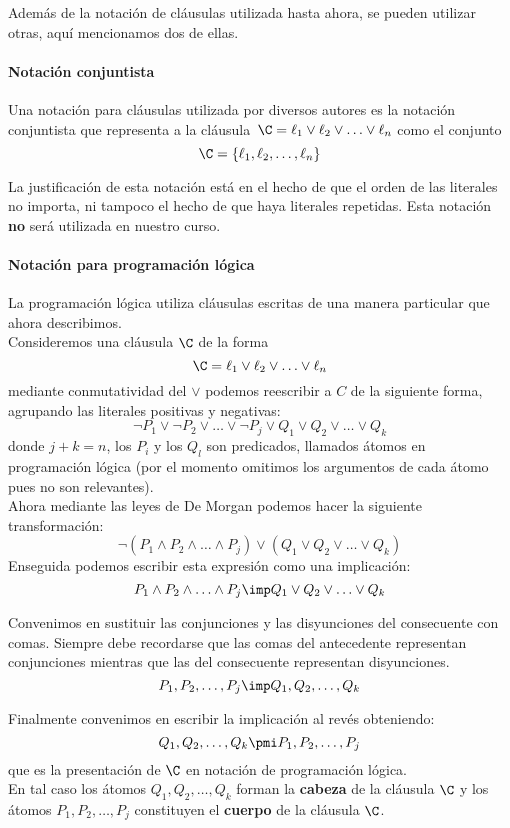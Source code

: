 \documentclass[11pt,letterpaper]{article}
\begin{document}
Además de la notación de cláusulas utilizada hasta ahora, se pueden
utilizar otras, aquí mencionamos dos de ellas.

\paragraph{Notación conjuntista}
Una notaci\'on para cláusulas utilizada por diversos autores es la notaci\'on 
conjuntista que representa a la 
cl\'ausula~$\C= \ell_1\lor \ell_2\lor\ldots\lor \ell_n$
como el conjunto
$$
\C=\{\ell_1,\ell_2,\ldots,\ell_n\}
$$

La justificación de esta notaci\'on est\'a en el hecho de que el orden de
las literales no importa, ni tampoco el hecho de que haya literales
repetidas. Esta notaci\'on \textbf{no} ser\'a utilizada en nuestro curso.

\paragraph{Notaci\'on para programaci\'on l\'ogica}
La programaci\'on l\'ogica utiliza cl\'ausulas escritas de una manera
particular que ahora describimos.\\
Consideremos una cl\'ausula $\C$ de la forma 
$$ \C=\ell_1\lor \ell_2\lor\ldots\lor \ell_n $$
mediante conmutatividad del $\lor$ podemos reescribir a $C$ de la siguiente
forma, agrupando las literales positivas y negativas:
$$ 
\neg P_1\lor\neg P_2\lor\ldots\lor \neg P_j\lor Q_1\lor Q_2\lor\ldots\lor Q_k
$$
donde $j+k=n$, los $P_i$ y los $Q_l$ son predicados, llamados \'atomos
en programaci\'on l\'ogica (por el momento omitimos
los argumentos de cada \'atomo pues no son relevantes).\\
Ahora mediante las leyes de De Morgan podemos hacer la siguiente
transformaci\'on:
$$
\neg (P_1\land P_2\land\ldots\land P_j) \lor (Q_1\lor Q_2\lor\ldots\lor Q_k)
$$
\noindent Enseguida podemos escribir esta expresi\'on como una implicaci\'on:
$$
P_1\land P_2\land\ldots\land P_j \imp Q_1\lor Q_2\lor\ldots\lor Q_k
$$

\noindent Convenimos en  sustituir las conjunciones y las disyunciones del 
consecuente con comas. Siempre debe recordarse que las comas del antecedente 
representan conjunciones mientras que las del consecuente representan 
disyunciones. 
$$
P_1, P_2,\ldots, P_j \imp Q_1, Q_2,\ldots, Q_k
$$

\noindent Finalmente convenimos en escribir la implicaci\'on al revés obteniendo:
$$
Q_1,Q_2,\ldots, Q_k \pmi P_1, P_2,\ldots, P_j
$$
\noindent que es la presentaci\'on de $\C$ en notaci\'on de programaci\'on 
l\'ogica. \\
En tal caso los \'atomos $Q_1,Q_2,\ldots,Q_k$ forman la \textbf{cabeza} de la
cl\'ausula $\C$ y los \'atomos $P_1,P_2,\ldots, P_j$ constituyen el
\textbf{cuerpo} de la cl\'ausula $\C$.
\end{document}
